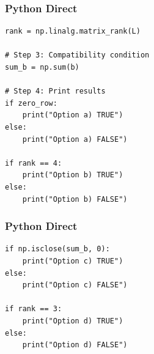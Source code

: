 \documentclass{beamer}
\begin{document}
\begin{frame}[fragile]
\frametitle{Python Direct}
\begin{lstlisting}
rank = np.linalg.matrix_rank(L)

# Step 3: Compatibility condition
sum_b = np.sum(b)

# Step 4: Print results
if zero_row:
    print("Option a) TRUE")
else:
    print("Option a) FALSE")

if rank == 4:
    print("Option b) TRUE")
else:
    print("Option b) FALSE")
\end{lstlisting}
\end{frame}
\begin{frame}[fragile]
\frametitle{Python Direct}
\begin{lstlisting}
if np.isclose(sum_b, 0):
    print("Option c) TRUE")
else:
    print("Option c) FALSE")

if rank == 3:
    print("Option d) TRUE")
else:
    print("Option d) FALSE")
\end{lstlisting}
\end{frame}
\end{document}
